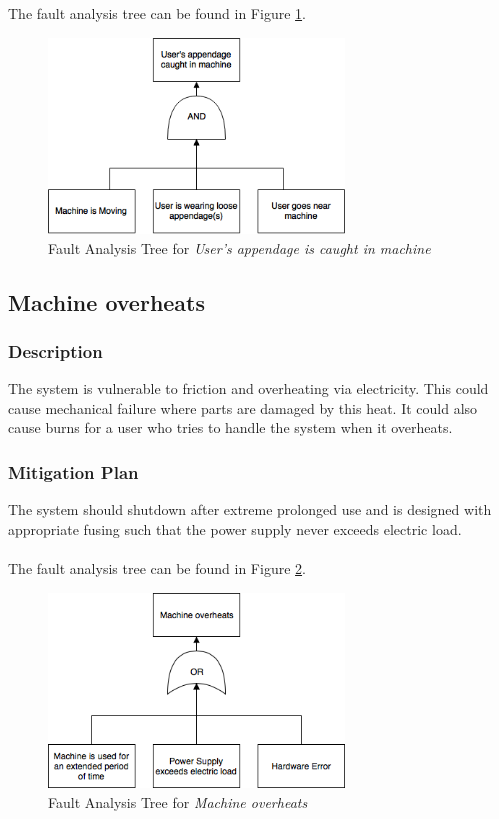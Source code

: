 \documentclass[11pt]{article}
\begin{document}
The fault analysis tree can be found in Figure \ref{fig:ft-appendage}.

\begin{figure}[H]
   \centering
   \includegraphics[width=0.7\textwidth]{img/ft-appendage.png} %
   \caption{Fault Analysis Tree for \textit{User's appendage is caught in machine}}
   \label{fig:ft-appendage}
\end{figure}

\subsection{Machine overheats}
\subsubsection*{Description}
The system is vulnerable to friction and overheating via electricity. This could cause mechanical failure where parts are damaged by this heat. It could also cause burns for a user who tries to handle the system when it overheats.
\subsubsection*{Mitigation Plan}
The system should shutdown after extreme prolonged use and is designed with appropriate fusing such that the power supply never exceeds electric load. \\ \\

The fault analysis tree can be found in Figure \ref{fig:ft-overheat}.

\begin{figure}[H]
   \centering
   \includegraphics[width=0.7\textwidth]{img/ft-overheat.png} %
   \caption{Fault Analysis Tree for \textit{Machine overheats}}
   \label{fig:ft-overheat}
\end{figure}
\end{document}
